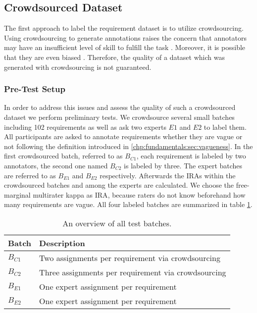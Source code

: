 \subsection{Crowdsourced Dataset}
\label{chp:study:sec:study_objects:crowdsourced_dataset}

The first approach to label the requirement dataset is to utilize crowdsourcing.
Using crowdsourcing to generate annotations raises the concern that annotators may have an insufficient level of skill to fulfill the task \parencite{Quinn:2011}.
Moreover, it is possible that they are even biased \parencite{Kittur:2008}.
Therefore, the quality of a dataset which was generated with crowdsourcing is not guaranteed.

\subsubsection{Pre-Test Setup}
In order to address this issues and assess the quality of such a crowdsourced dataset we perform preliminary tests.
We crowdsource several small batches including 102 requirements as well as ask two experts $E1$ and $E2$ to label them.
All participants are asked to annotate requirements whether they are vague or not following the definition introduced in \cref{chp:fundamentals:sec:vagueness}.
In the first crowdsourced batch, referred to as $B_{C1}$, each requirement is labeled by two annotators, the second one named $B_{C2}$ is labeled by three.
The expert batches are referred to as $B_{E1}$ and $B_{E2}$ respectively.
Afterwards the \acp{IRA} within the crowdsourced batches and among the experts are calculated.
We choose the free-marginal multirater kappa as \ac{IRA}, because raters do not know beforehand how many requirements are vague.
All four labeled batches are summarized in table \cref{tab:study:objects:crowdsourcing:batches}.
\begin{table}[htpb]
    \centering
    \begin{tabular}{l l}
        \toprule
        Batch & Description \\
        \midrule
        $B_{C1}$ & Two assignments per requirement via crowdsourcing\\
        $B_{C2}$ & Three assignments per requirement via crowdsourcing\\
        $B_{E1}$ & One expert assignment per requirement \\
        $B_{E2}$ & One expert assignment per requirement \\
        \bottomrule
    \end{tabular}
    \caption[Overview of test batches]{An overview of all test batches.}\label{tab:study:objects:crowdsourcing:batches}
\end{table}

